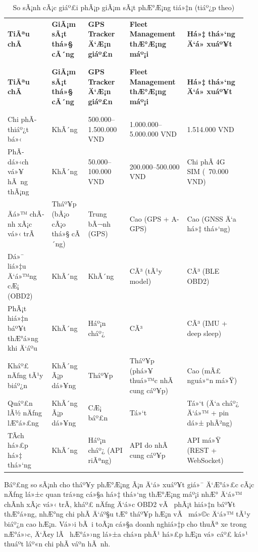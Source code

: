 \documentclass[a4paper]{extarticle}
\newcommand{\thesissettableid}[2]{%
  \renewcommand{\thetable}{#1}%
  \renewcommand{\theHtable}{#2}%
}
\begin{document}
{\thesissettableid{2.1}{tab-ch2-vehicle-monitoring-solutions-comparison}
\def\LTcaptype{table}
\begin{longtable}{|L{0.179\linewidth}|L{0.141\linewidth}|L{0.167\linewidth}|L{0.227\linewidth}|L{0.231\linewidth}|}
\caption{So sÃ¡nh cÃ¡c giáº£i phÃ¡p giÃ¡m sÃ¡t phÆ°Æ¡ng tiá»‡n}\label{tab:ch2-vehicle-monitoring-solutions-comparison}\\
\hline \textbf{TiÃªu chÃ­} & \textbf{GiÃ¡m sÃ¡t thá»§ cÃ´ng} & \textbf{GPS Tracker Ä‘Æ¡n giáº£n} & \textbf{Fleet Management
thÆ°Æ¡ng máº¡i} & \textbf{Há»‡ thá»‘ng Ä‘á» xuáº¥t} \\
\\\hline
\endfirsthead
\caption[]{So sÃ¡nh cÃ¡c giáº£i phÃ¡p giÃ¡m sÃ¡t phÆ°Æ¡ng tiá»‡n (tiáº¿p theo)}\\
\hline \textbf{TiÃªu chÃ­} & \textbf{GiÃ¡m sÃ¡t thá»§ cÃ´ng} & \textbf{GPS Tracker Ä‘Æ¡n giáº£n} & \textbf{Fleet Management
thÆ°Æ¡ng máº¡i} & \textbf{Há»‡ thá»‘ng Ä‘á» xuáº¥t} \\
\\\hline
\endhead
\\\hline
\endfoot
\endlastfoot
Chi phÃ­ thiáº¿t bá»‹ & KhÃ´ng & 500.000--1.500.000 VND & 1.000.000--5.000.000
VND & 1.514.000 VND \\\hline
PhÃ­ dá»‹ch vá»¥ hÃ ng thÃ¡ng & KhÃ´ng & 50.000--100.000 VND & 200.000--500.000
VND & Chi phÃ­ 4G SIM (~70.000 VND) \\\hline
Äá»™ chÃ­nh xÃ¡c vá»‹ trÃ­ & Tháº¥p (bÃ¡o cÃ¡o thá»§ cÃ´ng) & Trung bÃ¬nh (GPS) & Cao
(GPS + A-GPS) & Cao (GNSS Ä‘a há»‡ thá»‘ng) \\\hline
Dá»¯ liá»‡u Ä‘á»™ng cÆ¡ (OBD2) & KhÃ´ng & KhÃ´ng & CÃ³ (tÃ¹y model) & CÃ³ (BLE
OBD2) \\\hline
PhÃ¡t hiá»‡n báº¥t thÆ°á»ng khi Ä‘áº­u & KhÃ´ng & Háº¡n cháº¿ & CÃ³ & CÃ³ (IMU + deep
sleep) \\\hline
Kháº£ nÄƒng tÃ¹y biáº¿n & KhÃ´ng Ã¡p dá»¥ng & Tháº¥p & Tháº¥p (phá»¥ thuá»™c nhÃ  cung cáº¥p) & Cao
(mÃ£ nguá»“n má»Ÿ) \\\hline
Quáº£n lÃ½ nÄƒng lÆ°á»£ng & KhÃ´ng Ã¡p dá»¥ng & CÆ¡ báº£n & Tá»‘t & Tá»‘t (Ä‘a cháº¿ Ä‘á»™ + pin
dá»± phÃ²ng) \\\hline
TÃ­ch há»£p há»‡ thá»‘ng & KhÃ´ng & Háº¡n cháº¿ (API riÃªng) & API do nhÃ  cung cáº¥p & API má»Ÿ
(REST + WebSocket) \\\hline
\end{longtable}
}

Báº£ng so sÃ¡nh cho tháº¥y phÆ°Æ¡ng Ã¡n Ä‘á» xuáº¥t giá»¯ Ä‘Æ°á»£c cÃ¡c nÄƒng lá»±c quan trá»ng
cá»§a há»‡ thá»‘ng thÆ°Æ¡ng máº¡i nhÆ° Ä‘á»™ chÃ­nh xÃ¡c vá»‹ trÃ­, kháº£ nÄƒng Ä‘á»c OBD2 vÃ 
phÃ¡t hiá»‡n báº¥t thÆ°á»ng, nhÆ°ng chi phÃ­ Ä‘áº§u tÆ° tháº¥p hÆ¡n vÃ  má»©c Ä‘á»™ tÃ¹y biáº¿n
cao hÆ¡n. Vá»›i bÃ i toÃ¡n cá»§a doanh nghiá»‡p cho thuÃª xe trong nÆ°á»›c, Ä‘Ã¢y lÃ 
hÆ°á»›ng lá»±a chá»n phÃ¹ há»£p hÆ¡n vá» cáº£ ká»¹ thuáº­t láº«n chi phÃ­ váº­n hÃ nh.
\end{document}
